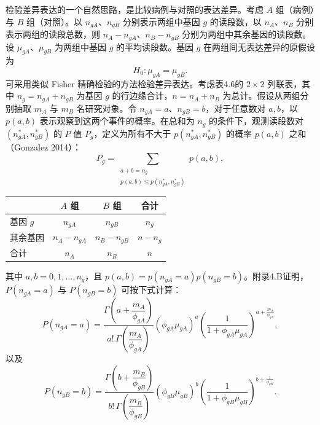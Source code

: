 检验差异表达的一个自然思路，是比较病例与对照的表达差异。考虑 $A$ 组（病例）与 $B$ 组（对照）。以 $n_{gA}$、$n_{gB}$ 分别表示两组中基因 $g$ 的读段数，以 $n_A$、$n_B$ 分别表示两组的读段总数，则 $n_A-n_{gA}$、$n_B-n_{gB}$ 分别为两组中其余基因的读段数。设 $\mu_{gA}$、$\mu_{gB}$ 为两组中基因 $g$ 的平均读段数。基因 $g$ 在两组间无表达差异的原假设为
\[
H_0:\mu_{gA}=\mu_{gB}.
\]
可采用类似 Fisher 精确检验的方法检验差异表达。考虑表4.6的 $2\times2$ 列联表，其中 $n_g=n_{gA}+n_{gB}$ 为基因 $g$ 的行边缘合计，$n=n_A+n_B$ 为总计。假设从两组分别抽取 $m_A$ 与 $m_B$ 名研究对象。令 $n_{gA}=a$、$n_{gB}=b$，对于任意数对 $a,b$，以 $p(a,b)$ 表示观察到这两个事件的概率。在总和为 $n_g$ 的条件下，观测读段数对 $(n_{gA}^*,n_{gB}^*)$ 的 $P$ 值 $P_g$，定义为所有不大于 $p(n_{gA}^*,n_{gB}^*)$ 的概率 $p(a,b)$ 之和（Gonzalez 2014）：
\begin{equation}
P_g=\sum_{\substack{a+b=n_g\\p(a,b)\le p(n_{gA}^*,n_{gB}^*)}}p(a,b),
\tag{4.106}
\end{equation}
\begin{table}[htbp]
\centering
{}
\begin{tabular}{lccc}
\toprule
&$A$ 组&$B$ 组&合计\\
\midrule
基因 $g$&$n_{gA}$&$n_{gB}$&$n_g$\\
其余基因&$n_A-n_{gA}$&$n_B-n_{gB}$&$n-n_g$\\
合计&$n_A$&$n_B$&$n$\\
\bottomrule
\end{tabular}
\end{table}
\FloatBarrier
其中 $a,b=0,1,\ldots,n_g$，且 $p(a,b)=p(n_{gA}=a)p(n_{gB}=b)$。附录4.B证明，$P(n_{gA}=a)$ 与 $P(n_{gB}=b)$ 可按下式计算：
\begin{equation}
P(n_{gA}=a)=\frac{\Gamma\left(a+\dfrac{m_A}{\phi_{gA}}\right)}
{a!\,\Gamma\left(\dfrac{m_A}{\phi_{gA}}\right)}
(\phi_{gA}\mu_{gA})^a
\left(\frac1{1+\phi_{gA}\mu_{gA}}\right)^{a+\frac{m_A}{\phi_{gA}}},
\tag{4.107}
\end{equation}
以及
\begin{equation}
P(n_{gB}=b)=\frac{\Gamma\left(b+\dfrac{m_B}{\phi_{gB}}\right)}
{b!\,\Gamma\left(\dfrac{m_B}{\phi_{gB}}\right)}
(\phi_{gB}\mu_{gB})^b
\left(\frac1{1+\phi_{gB}\mu_{gB}}\right)^{b+\frac1{\phi_{gB}}}.
\tag{4.108}
\end{equation}
\FloatBarrier
